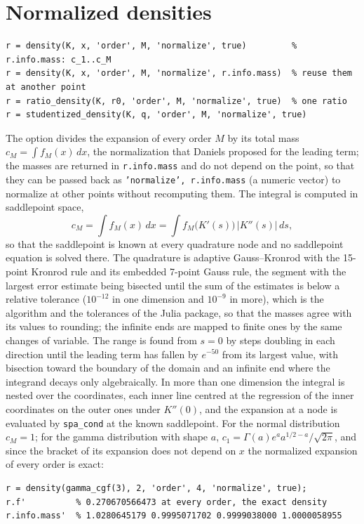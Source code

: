 \documentclass[11pt]{article}
\newcommand{\prog}[1]{\texttt{#1}}
\begin{document}
\section{Normalized densities}\label{sec:norm}

\begin{lstlisting}
r = density(K, x, 'order', M, 'normalize', true)         % r.info.mass: c_1..c_M
r = density(K, x, 'order', M, 'normalize', r.info.mass)  % reuse them at another point
r = ratio_density(K, r0, 'order', M, 'normalize', true)  % one ratio
r = studentized_density(K, q, 'order', M, 'normalize', true)
\end{lstlisting}
The option divides the expansion of every order $M$ by its total mass $c_M=\int f_M(x)\,dx$, the
normalization that Daniels proposed for the leading term; the masses are returned in
\prog{r.info.mass} and do not depend on the point, so that they can be passed back as
\prog{'normalize', r.info.mass} (a numeric vector) to normalize at other points without
recomputing them. The integral is computed in saddlepoint space,
\[
c_M=\int f_M(x)\,dx=\int f_M\bigl(K'(s)\bigr)\,\bigl|K''(s)\bigr|\,ds,
\]
so that the saddlepoint is known at every quadrature node and no saddlepoint equation is solved
there. The quadrature is adaptive Gauss--Kronrod with the 15-point Kronrod rule and its embedded
7-point Gauss rule, the segment with the largest error estimate being bisected until the sum of the
estimates is below a relative tolerance ($10^{-12}$ in one dimension and $10^{-9}$ in more), which is
the algorithm and the tolerances of the Julia package, so that the masses agree with its values to
rounding; the infinite ends are mapped to finite ones by the same changes of variable. The range is
found from $s=0$ by steps doubling in each direction until the leading term has fallen by $e^{-50}$
from its largest value, with bisection toward the boundary of the domain and an infinite end where
the integrand decays only algebraically. In more than one dimension the integral is nested over the
coordinates, each inner line centred at the regression of the inner coordinates on the outer ones
under $K''(0)$, and the expansion at a node is evaluated by \prog{spa\_cond} at the known saddlepoint.
For the normal distribution $c_M=1$; for the gamma distribution with shape $a$,
$c_1=\Gamma(a)e^aa^{1/2-a}/\sqrt{2\pi}$, and since the bracket of its expansion does not depend on $x$
the normalized expansion of every order is exact:
\begin{lstlisting}
r = density(gamma_cgf(3), 2, 'order', 4, 'normalize', true);
r.f'          % 0.270670566473 at every order, the exact density
r.info.mass'  % 1.0280645179 0.9995071702 0.9999038000 1.0000058955
\end{lstlisting}
\end{document}
